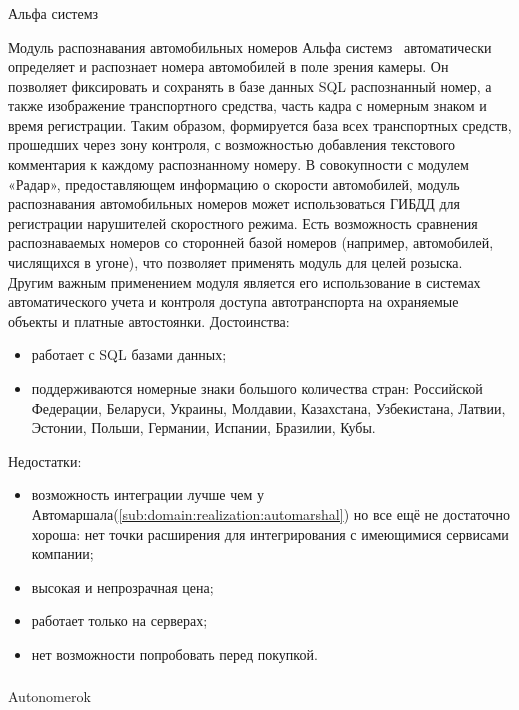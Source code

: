 \subsubsection{}
\label{sub:domain:analogs:alpha_systems}
Альфа системз

Модуль распознавания автомобильных номеров Альфа системз~\cite{alpha_system} автоматически определяет и распознает номера автомобилей в поле зрения камеры. Он позволяет фиксировать и сохранять в базе данных SQL распознанный номер, а также изображение транспортного средства, часть кадра с номерным знаком и время регистрации. Таким образом, формируется база всех транспортных средств, прошедших через зону контроля, с возможностью добавления текстового комментария к каждому распознанному номеру. В совокупности с модулем «Радар», предоставляющем информацию о скорости автомобилей, модуль распознавания автомобильных номеров может использоваться ГИБДД для регистрации нарушителей скоростного режима. Есть возможность сравнения распознаваемых номеров со сторонней базой номеров (например, автомобилей, числящихся в угоне), что позволяет применять модуль для целей розыска. Другим важным применением модуля является его использование в системах автоматического учета и контроля доступа автотранспорта на охраняемые объекты и платные автостоянки.
Достоинства:
\begin{itemize}
  \item работает с SQL базами данных;
  \item поддерживаются номерные знаки большого количества стран: Российской Федерации, Беларуси, Украины, Молдавии, Казахстана, Узбекистана, Латвии, Эстонии, Польши, Германии, Испании, Бразилии, Кубы.
\end{itemize}
Недостатки:
\begin{itemize}
  \item возможность интеграции лучше чем у Автомаршала(\ref{sub:domain:realization:automarshal}) но все ещё не достаточно хороша: нет точки расширения для интегрирования с имеющимися сервисами компании;
  \item высокая и непрозрачная цена;
  \item работает только на \windows{} серверах;
  \item нет возможности попробовать перед покупкой.
\end{itemize}

\subsubsection{}
Autonomerok


